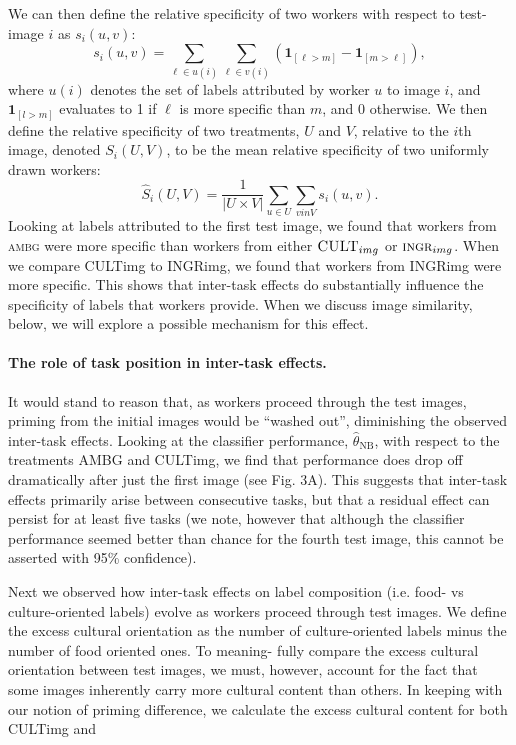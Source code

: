 \documentclass[12pt]{article}
\begin{document}
We can then define the relative specificity of two workers with respect to 
test-image $i$ as $s_i(u, v)$:
$$
	s_i(u,v) = \sum_{\ell \in u(i)} \sum_{\ell \in v(i)} 
	\left( \mathbf{1}_{[\ell > m]} - \mathbf{1}_{[m>\ell]} \right),
$$
where $u(i)$ denotes the set of labels attributed by worker $u$ to image $i$, 
and $\mathbf{1}_{[l>m]}$ evaluates to 1 if $\ell$ is more specific than $m$, 
and 0 otherwise. We then define the relative specificity of two treatments, 
$U$ and $V$, relative to the $i$th image, denoted $S_i(U,V)$, to be the mean 
relative specificity of two uniformly drawn workers:
$$
	\hat{S}_i(U,V) = \frac{1}{|U \times V|} \sum_{u \in U} \sum_{v in V}
		s_i(u,v).
$$
Looking at labels attributed to the first test image, we found that workers 
from \textsc{ambg} were more specific than workers from either 
$\textsc{CULT}_{img}$ or $\textsc{ingr}_{img}$.  When we compare CULTimg to 
INGRimg, we found that workers from INGRimg were more specific. This shows 
that inter-task effects do substantially influence the specificity of labels 
that workers provide. When we discuss image similarity, below, we will explore 
a possible mechanism for this effect.

\paragraph{The role of task position in inter-task effects.}
It would stand to reason that, as workers proceed through the test images, 
priming from the initial images would be ``washed out'', diminishing the 
observed
inter-task effects. Looking at the classifier performance, 
$\hat{\theta}_\mathrm{NB}$, with respect to the treatments AMBG and CULTimg, 
we find that performance does drop off dramatically after just the first image 
(see Fig. 3A). This suggests that inter-task effects primarily arise between 
consecutive tasks, but that a residual effect can persist for at least five 
tasks (we note, however that although the classifier performance seemed better 
than chance for the fourth test image, this cannot be asserted with 95\% 
confidence).

Next we observed how inter-task effects on label composition (i.e. food- vs 
culture-oriented labels) evolve as workers proceed through test images. We 
define the excess cultural orientation as the number of culture-oriented 
labels minus the number of food oriented ones. To meaning- fully compare the 
excess cultural orientation between test images, we must, however, account 
for the fact that some images inherently carry more cultural content than 
others. In keeping with our notion of priming difference, we calculate the 
excess cultural content for both CULTimg and
\end{document}
